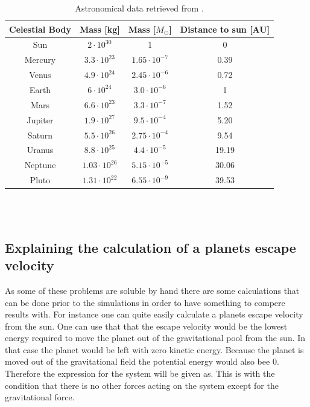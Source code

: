 \documentclass{article}
\begin{document}
    \begin{table}[H]
        \centering
        \caption{Astronomical data retrieved from \cite{solarsystemdata}. }
        \vspace{2mm}
        \label{tab:mass}
        \begin{tabular}{|c|c|c|c|}
            \hline
            Celestial Body & Mass [kg] & Mass [$M_{\odot}$] & Distance to sun [AU]\\
            \hline \hline
            Sun     & $ 2    \cdot10^{30} $ & 1                    & 0 \\
            Mercury & $ 3.3  \cdot10^{23} $ & $1.65 \cdot 10^{-7}$ & 0.39 \\
            Venus   & $ 4.9  \cdot10^{24} $ & $2.45 \cdot 10^{-6}$ & 0.72 \\
            Earth   & $ 6    \cdot10^{24} $ & $3.0 \cdot 10^{-6}$  & 1 \\
            Mars    & $ 6.6  \cdot10^{23} $ & $3.3 \cdot 10^{-7}$  & 1.52 \\
            Jupiter & $ 1.9  \cdot10^{27} $ & $9.5 \cdot 10^{-4}$  & 5.20 \\
            Saturn  & $ 5.5  \cdot10^{26} $ & $2.75 \cdot 10^{-4}$ & 9.54 \\
            Uranus  & $ 8.8  \cdot10^{25} $ & $4.4 \cdot 10^{-5}$  & 19.19 \\
            Neptune & $ 1.03 \cdot10^{26} $ & $5.15 \cdot 10^{-5}$ & 30.06 \\
            Pluto   & $ 1.31 \cdot10^{22} $ & $6.55 \cdot 10^{-9}$ & 39.53 \\
            \hline
        \end{tabular} \\
        \hspace{0pt}\\
    \end{table}

\subsection{Explaining the calculation of a planets escape velocity} \label{sec:escapevelocity}

    As some of these problems are soluble by hand there are some calculations that can be done prior to the simulations in order to have something to compere results with. For instance one can quite easily calculate a planets escape velocity from the sun. One can use that that the escape velocity would be the lowest energy required to move the planet out of the gravitational pool from the sun. In that case the planet would be left with zero kinetic energy. Because the planet is moved out of the gravitational field the potential energy would also bee 0. Therefore the expression for the system will be given as. This is with the condition that there is no other forces acting on the system except for the gravitational force.   \\
\end{document}
